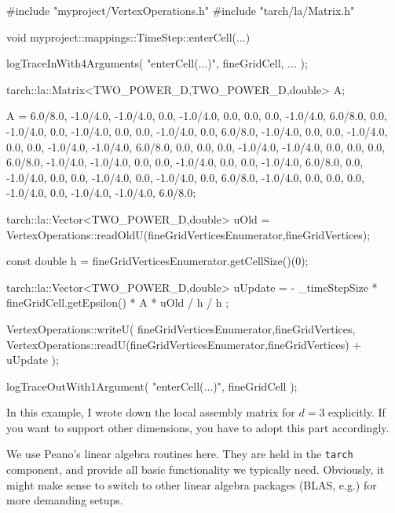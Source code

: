 \begin{code}
#include "myproject/VertexOperations.h"
#include "tarch/la/Matrix.h"

void myproject::mappings::TimeStep::enterCell(...) {
  logTraceInWith4Arguments( "enterCell(...)", fineGridCell, ... );

  tarch::la::Matrix<TWO_POWER_D,TWO_POWER_D,double> A;

  A =  6.0/8.0, -1.0/4.0, -1.0/4.0,      0.0, -1.0/4.0,      0.0,      0.0,      0.0,
      -1.0/4.0,  6.0/8.0,      0.0, -1.0/4.0,      0.0, -1.0/4.0,      0.0,      0.0,
      -1.0/4.0,      0.0,  6.0/8.0, -1.0/4.0,      0.0,      0.0, -1.0/4.0,      0.0,
           0.0, -1.0/4.0, -1.0/4.0,  6.0/8.0,      0.0,      0.0,      0.0, -1.0/4.0,
      -1.0/4.0,      0.0,      0.0,      0.0,  6.0/8.0, -1.0/4.0, -1.0/4.0,      0.0,
           0.0, -1.0/4.0,      0.0,      0.0, -1.0/4.0,  6.0/8.0,      0.0, -1.0/4.0,
           0.0,      0.0, -1.0/4.0,      0.0, -1.0/4.0,      0.0,  6.0/8.0, -1.0/4.0,
           0.0,      0.0,      0.0, -1.0/4.0,      0.0, -1.0/4.0, -1.0/4.0,  6.0/8.0;

  tarch::la::Vector<TWO_POWER_D,double> uOld = 
    VertexOperations::readOldU(fineGridVerticesEnumerator,fineGridVertices);

  const double h = fineGridVerticesEnumerator.getCellSize()(0);

  tarch::la::Vector<TWO_POWER_D,double> uUpdate = 
    - _timeStepSize * fineGridCell.getEpsilon() * A * uOld / h / h  ;

  VertexOperations::writeU(
    fineGridVerticesEnumerator,fineGridVertices,
    VertexOperations::readU(fineGridVerticesEnumerator,fineGridVertices) + uUpdate
  );

  logTraceOutWith1Argument( "enterCell(...)", fineGridCell );
}
\end{code}

\noindent
In this example, I wrote down the local assembly matrix for $d=3$ explicitly.
If you want to support other dimensions, you have to adopt this part
accordingly.

We use Peano's linear algebra routines here.
They are held in the \texttt{tarch} component, and provide all basic
functionality we typically need.
Obviously, it might make sense to switch to other linear algebra packages
(BLAS, e.g.) for more demanding setups.

